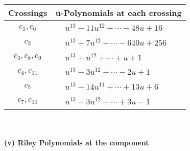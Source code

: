 \documentclass[1p]{elsarticle_modified}
\theoremstyle{definition}
\begin{document}
\begin{tabular}{m{50pt}|m{274pt}}
Crossings & \hspace{64pt}u-Polynomials at each crossing \\
\hline $$\begin{aligned}c_{1},c_{6}\end{aligned}$$&$\begin{aligned}
&u^{13}-11 u^{12}+\cdots-48 u+16
\end{aligned}$\\
\hline $$\begin{aligned}c_{2}\end{aligned}$$&$\begin{aligned}
&u^{13}+7 u^{12}+\cdots-640 u+256
\end{aligned}$\\
\hline $$\begin{aligned}c_{3},c_{8},c_{9}\end{aligned}$$&$\begin{aligned}
&u^{13}+u^{12}+\cdots+u+1
\end{aligned}$\\
\hline $$\begin{aligned}c_{4},c_{11}\end{aligned}$$&$\begin{aligned}
&u^{13}-3 u^{12}+\cdots-2 u+1
\end{aligned}$\\
\hline $$\begin{aligned}c_{5}\end{aligned}$$&$\begin{aligned}
&u^{13}-14 u^{11}+\cdots+13 u+6
\end{aligned}$\\
\hline $$\begin{aligned}c_{7},c_{10}\end{aligned}$$&$\begin{aligned}
&u^{13}-3 u^{12}+\cdots+3 u-1
\end{aligned}$\\
\hline
\end{tabular}\\~\\
\newpage\renewcommand{\arraystretch}{1}
\flushleft \textbf{(v) Riley Polynomials at the component}\newline \\
\end{document}
